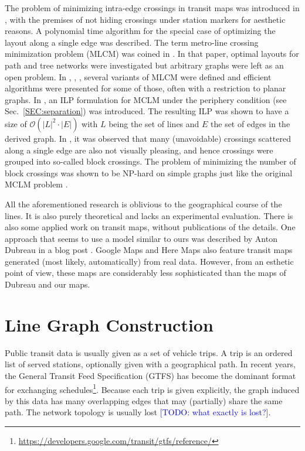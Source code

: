 \documentclass{llncs}
\newcommand\TODO[1]{\textcolor{blue}{\small [TODO: #1]}}
\begin{document}
The problem of minimizing intra-edge crossings in transit maps was introduced in \cite{ben06}, 
with the premises of not hiding crossings under station markers for aesthetic reasons.
A polynomial time algorithm for the special case of optimizing the layout along a single edge was described.
The term metro-line crossing minimization problem (MLCM) was coined in \cite{bek07}.
In that paper, optimal layouts for path and tree networks were investigated but arbitrary graphs were left as an open problem.
In \cite{arg08}, \cite{nol09}, \cite{arg10}, several variants of MLCM were defined and efficient algorithms were presented for some of those, often with a restriction to planar graphs.
In \cite{asq08}, an ILP formulation for MCLM under the periphery condition (see Sec.~\ref{SEC:separation}) was introduced.
The resulting ILP was shown to have a size of $\mathcal{O}(|L|^2 \cdot |E|)$ with $L$ being the set of lines and $E$ the set of edges in the derived graph.
In \cite{fin13b}, it was observed that many (unavoidable) crossings scattered along a single edge are also not visually pleasing, 
and hence crossings were grouped into so-called block crossings.
The problem of minimizing the number of block crossings was shown to be NP-hard on simple graphs just like the original MCLM problem \cite{fin13a}.

All the aforementioned research is oblivious to the geographical course of the lines.
It is also purely theoretical and lacks an experimental evaluation.
There is also some applied work on transit maps, without publications of the details.
One approach that seems to use a model similar to ours was described by Anton Dubreau in a blog post \cite{dub16}.
Google Maps and Here Maps also feature transit maps generated (most likely, automatically) from real data.
However, from an esthetic point of view, these maps are considerably less sophisticated than the maps of Dubreau and our maps.


%
\section{Line Graph Construction}\label{SEC:graph}
%

Public transit data is usually given as a set of vehicle trips. A trip is an ordered list of served stations, optionally given with a geographical path. In recent years, the General Transit Feed Specification (GTFS) has become the dominant format for exchanging schedules\footnote{\url{https://developers.google.com/transit/gtfs/reference/}}. Because each trip is given explicitly, the graph induced by this data has many overlapping edges that may (partially) share the same path. The network topology is usually lost \TODO{what exactly is lost?}.
\end{document}
